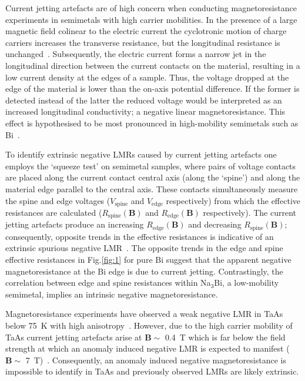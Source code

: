 \documentclass[11pt, a4paper]{article}
\begin{document}
Current jetting artefacts are of high concern when conducting magnetoresistance experiments in
semimetals with high carrier mobilities. In the presence of a large magnetic field colinear
to the electric current the cyclotronic motion of charge carriers increases the transverse
resistance, but the longitudinal resistance is unchanged~\cite{Squeezetest}.
Subsequently, the electric current
forms a narrow jet in the longitudinal direction between the current contacts on the material,
resulting in a low current density at the edges of a sample.
Thus, the voltage dropped at the edge of the material is lower than the
on-axis potential difference. If the former is detected instead of the latter the reduced voltage 
would be interpreted as an increased longitudinal conductivity; a negative linear magnetoresistance.
This effect is hypothesised to be most pronounced in high-mobility semimetals such as
Bi~\cite{BiMobility,Squeezetest}.

To identify extrinsic negative LMRs caused by current jetting artefacts one
employs the `squeeze test' on semimetal samples,
where pairs of voltage contacts are placed along 
the current contact central axis (along the `spine') and 
along the material edge parallel to the central axis.
These contacts simultaneously measure the spine and edge voltages
($V_\text{spine}$ and $V_\text{edge}$ respectively) from which the effective
resistances are
calculated ($R_\text{spine}(\bm{B})$ and $R_\text{edge}(\bm{B})$ respectively).
The current jetting artefacts produce an increasing $R_\text{edge}(\bm{B})$ and decreasing
$R_\text{spine}(\bm{B})$; consequently, opposite trends in the effective resistances is indicative of
an extrinsic spurious negative LMR~\cite{Squeezetest}.
The opposite trends in the edge and spine effective resistances in Fig.\ref{fig:1} for
pure Bi suggest that the apparent negative magnetoresistance at the Bi edge is
due to current jetting. Contrastingly, the correlation between edge and spine resistances 
within Na$_3$Bi, a low-mobility semimetal, implies an intrinsic negative magnetoresistance.


Magnetoresistance experiments have observed a weak negative LMR in TaAs below
\qty{75}{\kelvin} with high anisotropy~\cite{TaAs}. 
However, due to the high carrier mobility of TaAs
current jetting artefacts arise at $\bm{B} \sim$ \qty{0.4}{\tesla} which is far below
the field strength at which an anomaly induced negative LMR
is expected to manifest ($\bm{B} \sim$ \qty{7}{\tesla})~\cite{Squeezetest}.
Consequently, an anomaly induced negative magnetoresistance is impossible
to identify in TaAs and previously observed LMRs are likely extrinsic.
\end{document}
